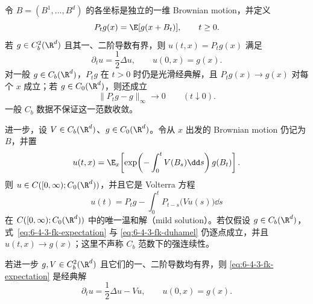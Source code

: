 \begin{theorem}\label{theorem:6-4-3-4}
令 $B=(B^1,\ldots,B^d)$ 的各坐标是独立的一维 Brownian motion，并定义
\[
 P_tg(x)=\E[g(x+B_t)],\qquad t\ge0.
\]
若 $g\in C_b^2(\R^d)$ 且其一、二阶导数有界，则
$u(t,x)=P_tg(x)$ 满足
\[
 \partial_tu=\frac12\Delta u,\qquad u(0,x)=g(x).
\]
对一般 $g\in C_b(\R^d)$，$P_tg$ 在 $t>0$ 时仍是光滑经典解，且
$P_tg(x)\to g(x)$ 对每个 $x$ 成立；若 $g\in C_0(\R^d)$，则还成立
\[
 \|P_tg-g\|_\infty\longrightarrow0\qquad(t\downarrow0).
\]
一般 $C_b$ 数据不保证这一范数收敛。

进一步，设 $V\in C_b(\R^d)$、$g\in C_0(\R^d)$。令从 $x$ 出发的 Brownian motion 仍记为
$B$，并置
\begin{equation}\label{eq:6-4-3-fk-expectation}
 u(t,x)=\E_x\!\left[
 \exp\!\left(-\int_0^tV(B_s)\dd s\right)g(B_t)\right].
\end{equation}
则 $u\in C([0,\infty);C_0(\R^d))$，并且它是 Volterra 方程
\begin{equation}\label{eq:6-4-3-fk-duhamel}
 u(t)=P_tg-\int_0^tP_{t-s}\bigl(Vu(s)\bigr)\dd s
\end{equation}
在 $C([0,\infty);C_0(\R^d))$ 中的唯一温和解（mild solution）。若仅假设
$g\in C_b(\R^d)$，式~\eqref{eq:6-4-3-fk-expectation} 与
\eqref{eq:6-4-3-fk-duhamel} 仍逐点成立，并且 $u(t,x)\to g(x)$；这里不声称
$C_b$ 范数下的强连续性。

若进一步 $g,V\in C_b^2(\R^d)$ 且它们的一、二阶导数均有界，则
\eqref{eq:6-4-3-fk-expectation} 是经典解
\[
 \partial_tu=\frac12\Delta u-Vu,\qquad u(0,x)=g(x).
\]
\end{theorem}

